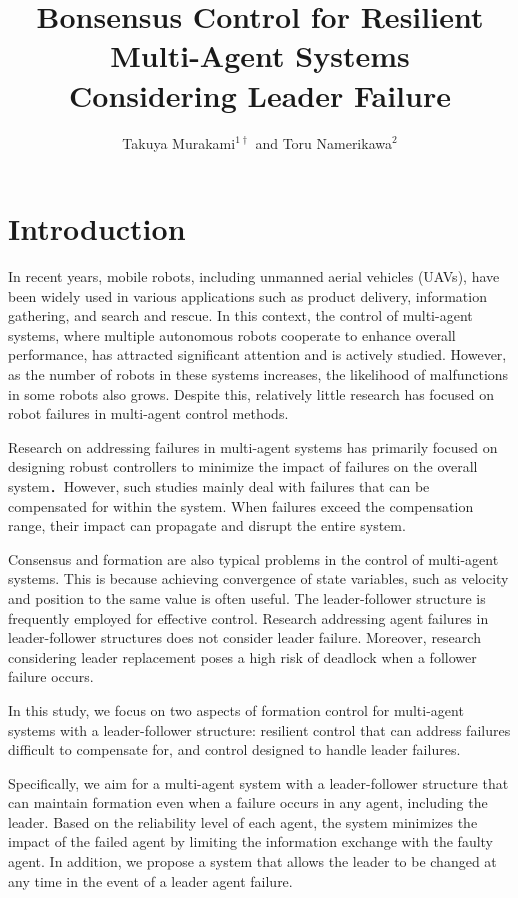 \documentclass[a4paper,fleqn,10pt,twocolumn]{SICE_ISCS}
\title{Bonsensus Control for Resilient Multi-Agent Systems\\
	 Considering Leader Failure}
\author{Takuya Murakami${}^{1\dagger}$ and Toru Namerikawa${}^{2}$}
\begin{document}
\maketitle


\section{Introduction}
In recent years, mobile robots, including unmanned aerial vehicles (UAVs), have been widely used in various applications such as product delivery, information gathering, and search and rescue. In this context, the control of multi-agent systems, where multiple autonomous robots cooperate to enhance overall performance, has attracted significant attention and is actively studied. However, as the number of robots in these systems increases, the likelihood of malfunctions in some robots also grows. Despite this, relatively little research has focused on robot failures in multi-agent control methods.

Research on addressing failures in multi-agent systems has primarily focused on designing robust controllers to minimize the impact of failures on the overall system\cite{Davoodi,2017FTC,2018FTC}．However, such studies mainly deal with  failures that can be compensated for within the system. When failures exceed the compensation range, their impact can propagate and disrupt the entire system.

Consensus and formation are also typical problems in the control of multi-agent systems. This is because achieving convergence of state variables, such as velocity and position to the same value is often useful. The leader-follower structure is frequently employed for effective control. Research addressing agent failures in leader-follower structures\cite{Resi_leaderfollower} does not consider leader failure. Moreover, research considering leader replacement\cite{Affection} poses a high risk of deadlock when a follower failure occurs.

In this study, we focus on two aspects of formation control for multi-agent systems with a leader-follower structure: resilient control that can address failures difficult to compensate for, and control designed to handle leader failures.

Specifically, we aim for a multi-agent system with a leader-follower structure that can maintain formation even when a failure occurs in any agent, including the leader. Based on the reliability level of each agent, the system minimizes the impact of the failed agent by limiting the information exchange with the faulty agent. In addition, we propose a system that allows the leader to be changed at any time in the event of a leader agent failure.
\end{document}
